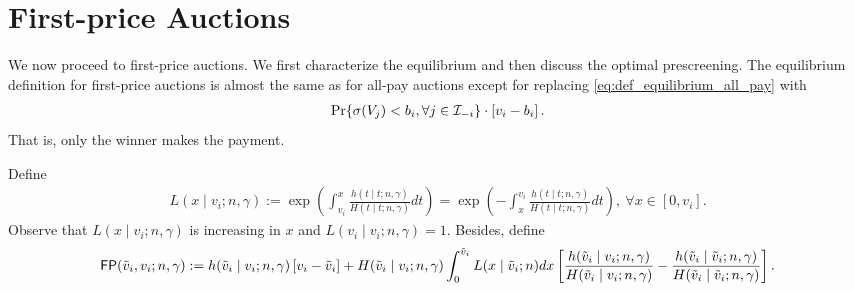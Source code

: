 \section{First-price Auctions}
\label{sec:firstprice_auctions}




We now proceed to first-price auctions. We first characterize the equilibrium and then discuss the optimal prescreening.
The equilibrium definition for first-price auctions is almost the same as  for all-pay auctions except for replacing \eqref{eq:def_equilibrium_all_pay} with
\begin{align*}
  \Pr\{\sigma(V_j)<b_i,\forall j\in \mathcal{I}_{-i}\} \cdot \left[v_i - b_i  \right].
\end{align*}
That is, only the winner makes the payment.

Define
\begin{align}
\label{eq:L}
    L(x\mid v_i;n,\gamma)
 :=\exp\left(\int_{v_i}^x \frac{h(t\mid t;n,\gamma)}{H(t\mid t;n,\gamma)}dt\right)
 =\exp\left(-\int_{x}^{v_i} \frac{h(t\mid t;n,\gamma)}{H(t\mid t;n,\gamma)}dt\right),~\forall x\in [0,v_i].
\end{align}
Observe that $L(x\mid v_i;n,\gamma)$ is increasing in $x$ and $L(v_i\mid v_i;n,\gamma) =1$.
Besides, define
\begin{align}
\mathsf{FP}(\tilde{v}_i,v_i;n,\gamma) :=
h(\tilde{v}_i\mid v_i;n,\gamma) \left[v_i - \tilde{v}_i\right]
 +H(\tilde{v}_i\mid v_i;n,\gamma) \int_0^{\tilde{v}_i}L(x\mid \tilde{v}_i;n)dx
\left[
 \frac{h(\tilde{v}_i\mid v_i;n,\gamma)}{H(\tilde{v}_i\mid v_i;n,\gamma)}  - \frac{h(\tilde{v}_i\mid \tilde{v}_i;n,\gamma)}{H(\tilde{v}_i\mid \tilde{v}_i;n,\gamma)}
 \right].\nonumber   
\end{align}

